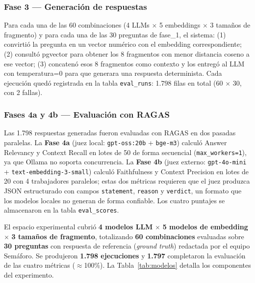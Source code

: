 \documentclass{article}
\begin{document}
\subsubsection*{Fase 3 — Generación de respuestas}

Para cada una de las 60 combinaciones (4 LLMs $\times$ 5 embeddings $\times$
3 tamaños de fragmento) y para cada una de las 30 preguntas de fase\_1,
el sistema: (1) convirtió la pregunta en un vector numérico con el embedding
correspondiente; (2) consultó pgvector para obtener los 8 fragmentos con
menor distancia coseno a ese vector; (3) concatenó esos 8 fragmentos como
contexto y los entregó al LLM con temperatura=0 para que generara una
respuesta determinista. Cada ejecución quedó registrada en la tabla
\texttt{eval\_runs}: 1.798 filas en total (60 $\times$ 30, con 2 fallas).

\subsubsection*{Fases 4a y 4b — Evaluación con RAGAS}

Las 1.798 respuestas generadas fueron evaluadas con RAGAS en dos pasadas
paralelas. La \textbf{Fase 4a} (juez local: \texttt{gpt-oss:20b} +
\texttt{bge-m3}) calculó Answer Relevancy y Context Recall en lotes de 50
de forma secuencial (\texttt{max\_workers=1}), ya que Ollama no soporta
concurrencia. La \textbf{Fase 4b} (juez externo: \texttt{gpt-4o-mini} +
\texttt{text-embedding-3-small}) calculó Faithfulness y Context Precision en
lotes de 20 con 4 trabajadores paralelos; estas dos métricas requieren que el
juez produzca JSON estructurado con campos \texttt{statement}, \texttt{reason}
y \texttt{verdict}, un formato que los modelos locales no generan de forma
confiable. Los cuatro puntajes se almacenaron en la tabla \texttt{eval\_scores}.


El espacio experimental cubrió \textbf{4 modelos LLM} $\times$ \textbf{5
modelos de embedding} $\times$ \textbf{3 tamaños de fragmento}, totalizando
\textbf{60 combinaciones} evaluadas sobre \textbf{30 preguntas} con
respuesta de referencia (\textit{ground truth}) redactada por el equipo
Semáforo. Se produjeron \textbf{1.798 ejecuciones} y \textbf{1.797}
completaron la evaluación de las cuatro métricas ($\approx$100\%).
La Tabla~\ref{tab:modelos} detalla los componentes del experimento.
\end{document}
